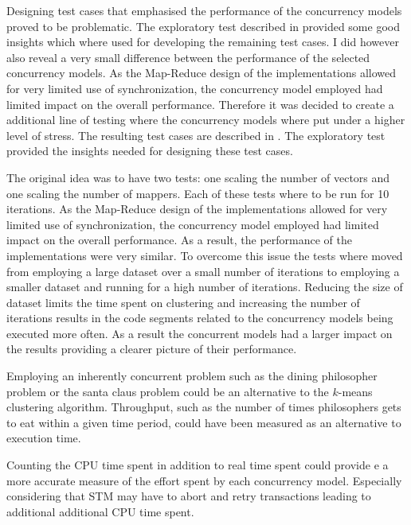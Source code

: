 Designing test cases that emphasised the performance of the concurrency models proved to be problematic. The exploratory test described in  provided some good insights which where used for developing the remaining test cases. I did however also reveal a very small difference between the performance of the selected concurrency models. As the Map-Reduce design of the implementations allowed for very limited use of synchronization, the concurrency model employed had limited impact on the overall performance. Therefore it was decided to create a additional line of testing where the concurrency models where put under a higher level of stress. The resulting test cases are described in . The exploratory test provided the insights needed for designing these test cases.

The original idea was to have two tests: one scaling the number of vectors and one scaling the number of mappers. Each of these tests where to be run for 10 iterations. As the Map-Reduce design of the implementations allowed for very limited use of synchronization, the concurrency model employed had limited impact on the overall performance. As a result, the performance of the implementations were very similar. To overcome this issue the tests where moved from employing a large dataset over a small number of iterations to employing a smaller dataset and running for a high number of iterations. Reducing the size of dataset limits the time spent on clustering and increasing the number of iterations results in the code segments related to the concurrency models being executed more often. As a result the concurrent models had a larger impact on the results providing a clearer picture of their performance.

Employing an inherently concurrent problem such as the dining philosopher problem\cite[p. 673]{hoare1978communicating} or the santa claus problem\cite{trono1994new} could be an alternative to the $k$-means clustering algorithm. Throughput, such as the number of times philosophers gets to eat within a given time period, could have been measured as an alternative to execution time.

Counting the CPU time spent in addition to real time spent could provide e a more accurate measure of the effort spent by each concurrency model. Especially considering that \ac{STM} may have to abort and retry transactions leading to additional additional CPU time spent.

